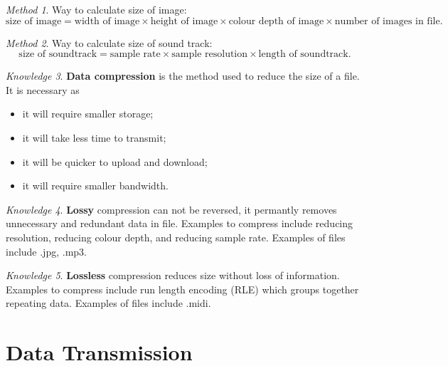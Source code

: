 \documentclass[8pt]{article}
\theoremstyle{remark}
\newtheorem{method}{Method}[subsection]
\newtheorem{knowledge}[method]{Knowledge}
\begin{document}
        \begin{method}
            Way to calculate size of image:
            \[
                \text{size of image} = \text{width of image} \times \text{height of image} \times \text{colour depth of image} \times \text{number of images in file}.
            \]
        \end{method}

        \begin{method}
            Way to calculate size of sound track:
            \[
                \text{size of soundtrack} = \text{sample rate} \times \text{sample resolution} \times \text{length of soundtrack}.
            \]
        \end{method}

        \begin{knowledge}
            \textbf{Data compression} is the method used to reduce the size of a file. It is necessary as
            \begin{itemize}
                \item it will require smaller storage;
                \item it will take less time to transmit;
                \item it will be quicker to upload and download;
                \item it will require smaller bandwidth.
            \end{itemize}
        \end{knowledge}

        \begin{knowledge}
            \textbf{Lossy} compression can not be reversed, it permantly removes unnecessary and redundant data in file. Examples to compress include reducing resolution, reducing colour depth, and reducing sample rate. Examples of files include .jpg, .mp3.
        \end{knowledge}

        \begin{knowledge}
            \textbf{Lossless} compression reduces size without loss of information. Examples to compress include run length encoding (RLE) which groups together repeating data. Examples of files include .midi.
        \end{knowledge}

    \section{Data Transmission}
\end{document}
